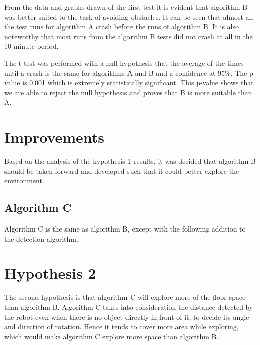 \documentclass[letterpaper, 10 pt, conference]{ieeeconf}  %
\begin{document}
From the data and graphs drawn of the first test it is evident that algorithm B was better suited to the task of avoiding obstacles. It can be seen that almost all the test runs for algorithm A crash before the runs of algorithm B. It is also noteworthy that most runs from the algorithm B tests did not crash at all in the 10 minute period.

The t-test was performed with a null hypothesis that the average of the times until a crash is the same for algorithms A and B and a confidence at 95\%. The p-value is 0.001 which is extremely statistically significant. This p-value shows that we are able to reject the null hypothesis and proves that B is more suitable than A.

\section{Improvements}
Based on the analysis of the hypothesis 1 results, it was decided that algorithm B should be taken forward and developed such that it could better explore the environment.

\subsection{Algorithm C}
Algorithm C is the same as algorithm B, except with the following addition to the detection algorithm.
\begin{algorithm}
	
	
	
\end{algorithm}

\section{Hypothesis 2}
The second hypothesis is that algorithm C will explore more of the floor space than algorithm B. Algorithm C takes into consideration the distance detected by the robot even when there is no object directly in front of it, to decide its angle and direction of rotation. Hence it tends to cover more area while exploring, which would make algorithm C explore more space than algorithm B.
\end{document}
